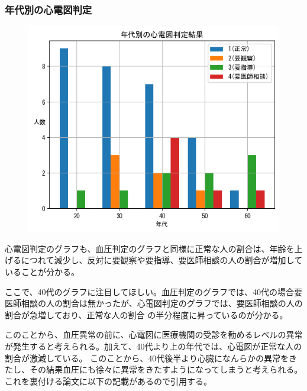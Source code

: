\documentclass[dvipdfmx]{jsarticle}
\begin{document}
            \subsubsection{年代別の心電図判定}
        \begin{figure}[H]
            \centering
            \includegraphics[scale=0.7]{images/allgender/age_heart_result.png}
        \end{figure}
        心電図判定のグラフも、血圧判定のグラフと同様に正常な人の割合は、年齢を上げるにつれて減少し、反対に要観察や要指導、要医師相談の人の割合が増加していることが分かる。\par
        ここで、40代のグラフに注目してほしい。血圧判定のグラフでは、40代の場合要医師相談の人の割合は無かったが、心電図判定のグラフでは、要医師相談の人の割合が急増しており、正常な人の割合
        の半分程度に昇っているのが分かる。\par 
        このことから、血圧異常の前に、心電図に医療機関の受診を勧めるレベルの異常が発生すると考えられる。加えて、40代より上の年代では、心電図が正常な人の割合が激減している。
        このことから、40代後半より心臓になんらかの異常をきたし、その結果血圧にも徐々に異常をきたすようになってしまうと考えられる。これを裏付ける論文に以下の記載があるので引用する。
\end{document}

